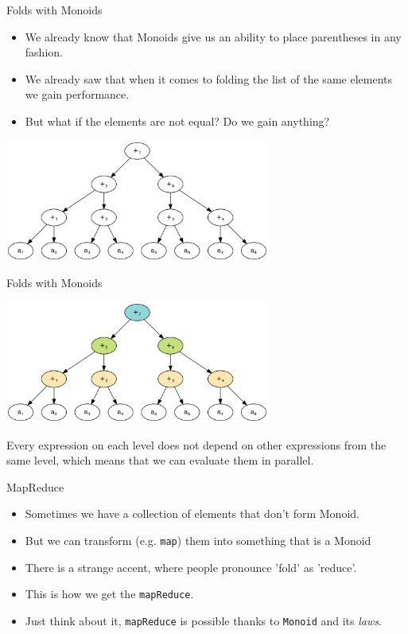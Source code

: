 \documentclass[presentation,aspectratio=169,smaller]{beamer}
\begin{document}
\begin{frame}[label={sec:orgaa1b783}]{Folds with Monoids}
\begin{itemize}
\item We already know that Monoids give us an ability to place parentheses in any
fashion.
\item We already saw that when it comes to folding the list of the same elements we
gain performance.
\item But what if the elements are not equal? Do we gain anything?
\end{itemize}

\pause
\begin{center}
\includegraphics[height=4cm]{.dot/fold-parallel-1.png}
\end{center}
\end{frame}

\begin{frame}[label={sec:org485fd51}]{Folds with Monoids}
\begin{center}
\includegraphics[height=4cm]{.dot/fold-parallel-2.png}
\end{center}

Every expression on each level does not depend on other expressions from the
same level, which means that we can evaluate them in parallel.
\end{frame}

\begin{frame}[label={sec:org9d85d3d},fragile]{MapReduce}
 \begin{itemize}
\item <1-> Sometimes we have a collection of elements that don't form Monoid.
\item <2-> But we can transform (e.g. \texttt{map}) them into something that is a Monoid
\item <3-> There is a strange accent, where people pronounce 'fold' as 'reduce'.
\item <4-> This is how we get the \texttt{mapReduce}.
\item <5-> Just think about it, \texttt{mapReduce} is possible thanks to \texttt{Monoid} and its
\emph{laws}.
\end{itemize}
\end{frame}
\end{document}
